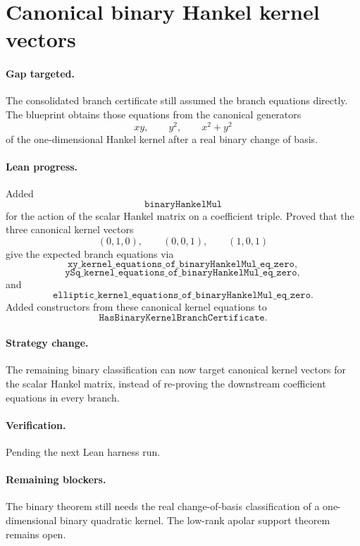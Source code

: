 \documentclass[11pt]{article}
\begin{document}
\section*{Canonical binary Hankel kernel vectors}

\paragraph{Gap targeted.}
The consolidated branch certificate still assumed the branch equations
directly.  The blueprint obtains those equations from the canonical generators
\[
xy,\qquad y^2,\qquad x^2+y^2
\]
of the one-dimensional Hankel kernel after a real binary change of basis.

\paragraph{Lean progress.}
Added
\[
\texttt{binaryHankelMul}
\]
for the action of the scalar Hankel matrix on a coefficient triple.  Proved
that the three canonical kernel vectors
\[
(0,1,0),\qquad (0,0,1),\qquad (1,0,1)
\]
give the expected branch equations via
\[
\texttt{xy\_kernel\_equations\_of\_binaryHankelMul\_eq\_zero},
\]
\[
\texttt{ySq\_kernel\_equations\_of\_binaryHankelMul\_eq\_zero},
\]
and
\[
\texttt{elliptic\_kernel\_equations\_of\_binaryHankelMul\_eq\_zero}.
\]
Added constructors from these canonical kernel equations to
\[
\texttt{HasBinaryKernelBranchCertificate}.
\]

\paragraph{Strategy change.}
The remaining binary classification can now target canonical kernel vectors
for the scalar Hankel matrix, instead of re-proving the downstream coefficient
equations in every branch.

\paragraph{Verification.}
Pending the next Lean harness run.

\paragraph{Remaining blockers.}
The binary theorem still needs the real change-of-basis classification of a
one-dimensional binary quadratic kernel.  The low-rank apolar support theorem
remains open.
\end{document}
